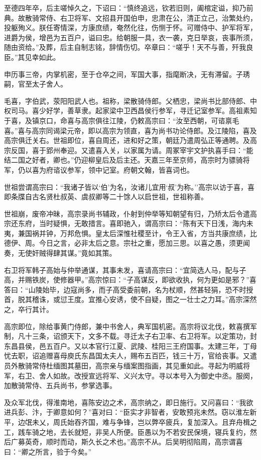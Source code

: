 \documentclass[]{article}
\begin{document}
至德四年卒，后主嗟悼久之，下诏曰：``慎终追远，钦若旧则，阖棺定谥，抑乃前典。故散骑常侍、右卫将军、文招县开国伯申，忠肃在公，清正立己，治繁处约，投躯殉义。朕任寄情深，方康庶绩，奄然化往，伤恻于怀。可赠侍中、护军将军，进爵为侯，增邑为五百户，谥曰忠。给朝服一具，衣一袭，克日举哀，丧事所须，随由资给。''及葬，后主自制志铭，辞情伤切。卒章曰：``嗟乎！天不与善，歼我良臣。''其见幸如此。

申历事三帝，内掌机密，至于仓卒之间，军国大事，指麾断决，无有滞留。子琇嗣，官至太子舍人。

毛喜，字伯武，荥阳阳武人也。祖称，梁散骑侍郎。父栖忠，梁尚书比部侍郎、中权司马。喜少好学，善草隶。起家梁中卫西昌侯行参军，寻迁记室参军。高祖素知于喜，及镇京口，命喜与高宗俱往江陵，仍敕高宗曰：``汝至西朝，可谘禀毛喜。''喜与高宗同谒梁元帝，即以高宗为领直，喜为尚书功论侍郎。及江陵陷，喜及高宗俱迁关右。世祖即位，喜自周还，进和好之策，朝廷乃遣周弘正等通聘。及高宗反国，喜于郢州奉迎。又遣喜入关，以家属为请。周冢宰宇文护执喜手曰：``能结二国之好者，卿也。''仍迎柳皇后及后主还。天嘉三年至京师，高宗时为骠骑将军，仍以喜为府谘议参军，领中记室。府朝文翰，皆喜词也。

世祖尝谓高宗曰：``我诸子皆以`伯'为名，汝诸儿宜用`叔'为称。''高宗以访于喜，喜即条牒自古名贤杜叔英、虞叔卿等二十馀人以启世祖，世祖称善。

世祖崩，废帝冲昧，高宗录尚书辅政，仆射到仲举等知朝望有归，乃矫太后令遣高宗还东府，当时疑惧，无敢措言。喜即驰入，谓高宗曰：``陈有天下日浅，海内未夷，兼国祸并钟，万邦危惧。皇太后深惟社稷至计，令王入省，方当共康庶绩，比德伊、周。今日之言，必非太后之意。宗社之重，愿加三思。以喜之愚，须更闻奏，无使奸贼得肆其谋。''竟如其策。

右卫将军韩子高始与仲举通谋，其事未发，喜请高宗曰：``宜简选人马，配与子高，并赐铁炭，使修器甲。''高宗惊曰：``子高谋反，即欲收执，何为更如是邪？''喜答曰：``山陵始毕，边寇尚多，而子高受委前朝，名为杖顺，然甚轻狷，恐不时授首，脱其稽诛，或愆王度。宜推心安诱，使不自疑，图之一壮士之力耳。''高宗深然之，卒行其计。

高宗即位，除给事黄门侍郎，兼中书舍人，典军国机密。高宗将议北伐，敕喜撰军制，凡十三条，诏颁天下，文多不载。寻迁太子右卫率、右卫将军。以定策功，封东昌县侯，邑五百户。又以本官行江夏、武陵、桂阳三王府国事。太建三年，丁母忧去职，诏追赠喜母庾氏东昌国太夫人，赐布五百匹，钱三十万，官给丧事。又遣员外散骑常侍杜缅图其墓田，高宗亲与缅案图指画，其见重如此。寻起为明威将军，右卫、舍人如故。改授宣远将军、义兴太守。寻以本号入为御史中丞。服阕，加散骑常侍、五兵尚书，参掌选事。

及众军北伐，得淮南地，喜陈安边之术，高宗纳之，即日施行。又问喜曰：``我欲进兵彭、汴，于卿意如何？''喜对曰：``臣实才非智者，安敢预兆未然。窃以淮左新平，边氓未乂，周氏始吞齐国，难与争锋，岂以弊卒疲兵，复加深入。且弃舟楫之工，践车骑之地，去长就短，非吴人所便。臣愚以为不若安民保境，寝兵复约，然后广募英奇，顺时而动，斯久长之术也。''高宗不从。后吴明彻陷周，高宗谓喜曰：``卿之所言，验于今矣。''
\end{document}
